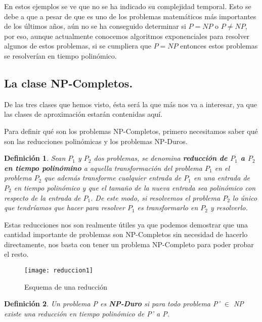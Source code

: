 \documentclass[a4paper,12pt,titlepage]{article}
\newtheorem{defi}{Definici\'on}[section]
\begin{document}
En estos ejemplos se ve que no se ha indicado su complejidad temporal. Esto
se debe a que a pesar de que es uno de los problemas matem\'aticos m\'as
importantes de los \'ultimos años, a\'un no se ha conseguido determinar
si $P = NP$ o $P \neq NP$, por eso, aunque actualmente conocemos algoritmos
exponenciales para resolver algunos de estos problemas, si se cumpliera que
$P = NP$ entonces estos problemas se resolver\'ian en tiempo polin\'omico.

\subsection{La clase NP-Completos.}

De las tres clases que hemos visto, \'esta ser\'a la que m\'as nos va a
interesar, ya que las clases de aproximaci\'on estar\'an contenidas aqu\'i.

Para definir qu\'e son los problemas NP-Completos, primero necesitamos
saber qu\'e son las reducciones polin\'omicas y los problemas NP-Duros.

\begin{defi}

Sean $P_{1}$ y $P_{2}$ dos problemas, se denomina \textbf{reducci\'on de $P_{1}$ a $P_{2}$ en tiempo polin\'omino} a aquella transformaci\'on del problema $P_{1}$ en el problema $P_{2}$ que adem\'as transforme cualquier entrada de $P_{1}$ en una entrada de $P_{2}$ en tiempo polin\'omico  y que el tamaño de la nueva entrada sea polin\'omico con respecto de la entrada de $P_1$. De este modo, si resolvemos el problema $P_2$ lo \'unico que tendr\'iamos que hacer para resolver $P_1$ es transformarlo en $P_2$ y resolverlo.

\end{defi}

Estas reducciones nos son realmente \'utiles ya que podemos demostrar
que una cantidad importante de problemas son NP-Completos sin necesidad
de hacerlo directamente, nos basta con tener un problema NP-Completo para
poder probar el resto.

\begin{figure}[h]
\centering
\texttt{[image: reduccion1]}
\caption{Esquema de una reducci\'on}
\label{reduccion1}
\end{figure}

\begin{defi}

Un problema P es \textbf{NP-Duro} si para todo problema P' $\in$ NP existe una reducci\'on en tiempo polin\'omico de P' a P.

\end{defi}
\end{document}
